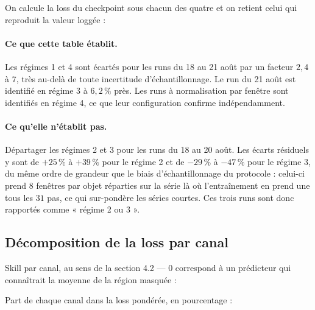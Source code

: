 \documentclass{article}
\begin{document}
On calcule la loss du checkpoint sous chacun des quatre et on retient celui qui reproduit la valeur loggée :

\begin{center}\footnotesize

\end{center}

\paragraph{Ce que cette table établit.} Les régimes 1 et 4 sont écartés pour les runs du 18 au 21 août par un facteur $2{,}4$ à $7$, très au-delà de toute incertitude d'échantillonnage. Le run du 21 août est identifié en régime 3 à $6{,}2\,\%$ près. Les runs à normalisation par fenêtre sont identifiés en régime 4, ce que leur configuration confirme indépendamment.

\paragraph{Ce qu'elle n'établit pas.} Départager les régimes 2 et 3 pour les runs du 18 au 20 août. Les écarts résiduels y sont de $+25\,\%$ à $+39\,\%$ pour le régime 2 et de $-29\,\%$ à $-47\,\%$ pour le régime 3, du même ordre de grandeur que le biais d'échantillonnage du protocole : celui-ci prend $8$ fenêtres par objet réparties sur la série là où l'entraînement en prend une tous les $31$ pas, ce qui sur-pondère les séries courtes. Ces trois runs sont donc rapportés comme « régime 2 ou 3 ».

\subsection{Décomposition de la loss par canal}

Skill par canal, au sens de la section 4.2 --- $0$ correspond à un prédicteur qui connaîtrait la moyenne de la région masquée :

\begin{center}\tiny

\end{center}

Part de chaque canal dans la loss pondérée, en pourcentage :

\begin{center}\tiny

\end{center}
\end{document}
